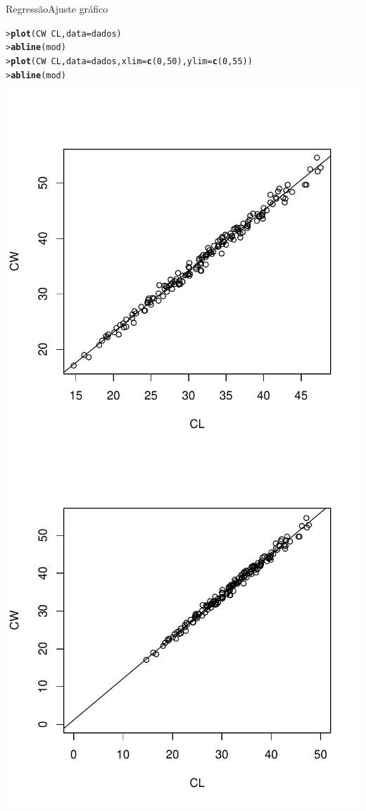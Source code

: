 \documentclass[10pt]{beamer}\usepackage{graphicx, color}
\makeatletter
\newcommand{\hlfunctioncall}[1]{\textcolor[rgb]{0,0,0.545098039215686}{\textbf{#1}}}%
\newenvironment{kframe}{%
 \def\at@end@of@kframe{}%
 \ifinner\ifhmode%
  \def\at@end@of@kframe{\end{minipage}}%
  \begin{minipage}{\columnwidth}%
 \fi\fi%
 \def\FrameCommand##1{\hskip\@totalleftmargin \hskip-\fboxsep
 \colorbox{shadecolor}{##1}\hskip-\fboxsep
     \hskip-\linewidth \hskip-\@totalleftmargin \hskip\columnwidth}%
 \MakeFramed {\advance\hsize-\width
   \@totalleftmargin\z@ \linewidth\hsize
   \@setminipage}}%
 {\par\unskip\endMakeFramed%
 \at@end@of@kframe}
\newenvironment{knitrout}{}{} %
\makeatother
\begin{document}
\begin{frame}[fragile=singleslide]{Regressão}{Ajuste gráfico}
\begin{knitrout}\small
{}\color{fgcolor}\begin{kframe}
\begin{alltt}
> \hlfunctioncall{plot}(CW ~ CL, data = dados)
> \hlfunctioncall{abline}(mod)
> \hlfunctioncall{plot}(CW ~ CL, data = dados, xlim = \hlfunctioncall{c}(0,50), ylim = \hlfunctioncall{c}(0,55))
> \hlfunctioncall{abline}(mod)
\end{alltt}
\end{kframe}

{\centering \includegraphics[width=.49\textwidth]{figure/unnamed-chunk-171} \includegraphics[width=.49\textwidth]{figure/unnamed-chunk-172} 

}


\end{knitrout}

\end{frame}
\end{document}
